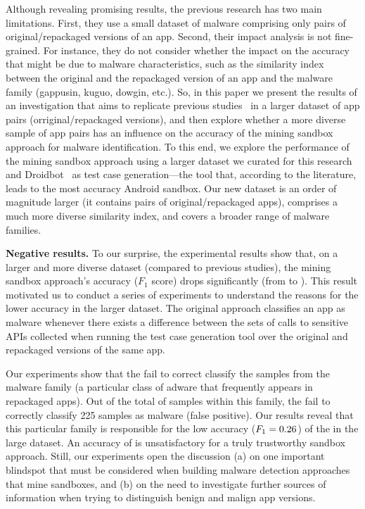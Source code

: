 Although revealing promising results, the previous research has two main limitations. First, they use a small dataset of malware comprising only \appsSmall pairs of original/repackaged versions of an app. Second, their impact analysis is not fine-grained. For instance, they do not consider whether the impact on the accuracy that might be due to malware characteristics, such as the similarity index between the original and the repackaged version of an app and the malware family (gappusin, kuguo, dowgin, etc.). So, in this paper we present the results of an investigation that aims to replicate previous studies~\cite{DBLP:conf/wcre/BaoLL18,DBLP:conf/scam/CostaMCMVBC20} in a larger dataset of app pairs (orriginal/repackaged versions), and then explore whether a more diverse sample of app pairs has an influence on the accuracy of the mining sandbox approach for malware identification. To this end, we explore the performance of the mining sandbox approach using a larger dataset we curated for this research and Droidbot~\cite{DBLP:conf/icse/LiYGC17} as test case generation---the tool that, according to the literature, leads to the most accuracy Android sandbox. Our new dataset is an order of magnitude larger (it contains \apps pairs of original/repackaged apps), comprises a much more diverse similarity index, and covers a broader range of malware families. 



{\bf Negative results.} To our surprise, the experimental results show that, on a larger and more diverse dataset (compared to previous studies), the mining sandbox approach's accuracy ($F_1$ score) drops significantly (from \fscoreSmall to \fscore). This result motivated us to conduct a series of experiments to understand the reasons for the lower accuracy in the larger dataset. The original approach classifies an app as malware whenever there exists a difference between the sets of calls to sensitive APIs collected when running the test case generation tool over the original and repackaged versions of the same app.


Our experiments show that the \mas fail to correct classify the samples
from the {\color{red}\gps malware family} (a particular class of adware that frequently appears in repackaged apps). Out of the total of \appsGps samples within this family,
the \mas fail to correctly classify {\color{red}225} samples as malware (false positive). Our results reveal that this particular family is
responsible for the low accuracy ($F_1 = 0.26$) of the \mas in the large dataset. 
An accuracy of \fscore is unsatisfactory for a truly trustworthy sandbox approach. Still, 
our experiments open the discussion (a) on one important blindspot that must be considered when building 
malware detection approaches that mine sandboxes, and (b) on the need to investigate further sources of
information when trying to distinguish benign and malign app versions.

